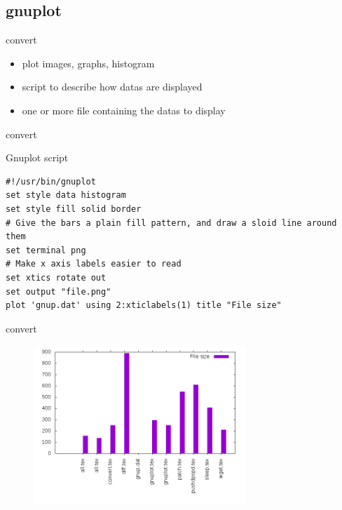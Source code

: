 \subsection{gnuplot}

\begin{frame}[fragile]{convert}
  \begin{itemize}
    \pause \item plot images, graphs, histogram
    \pause \item script to describe how datas are displayed
    \pause \item one or more file containing the datas to display
  \end{itemize}
\end{frame}

\begin{frame}[fragile]{convert}
  \begin{exampleblock}{Gnuplot script}
    \begin{lstlisting}[showstringspaces=false,basicstyle=\tiny]
#!/usr/bin/gnuplot
set style data histogram
set style fill solid border
# Give the bars a plain fill pattern, and draw a sloid line around them
set terminal png
# Make x axis labels easier to read
set xtics rotate out
set output "file.png"
plot 'gnup.dat' using 2:xticlabels(1) title "File size"
    \end{lstlisting}
  \end{exampleblock}
\end{frame}

\begin{frame}[fragile]{convert}
  \begin{figure}[!h]
    \includegraphics[height=6cm]{img/gnup.png}
  \end{figure}
\end{frame}

